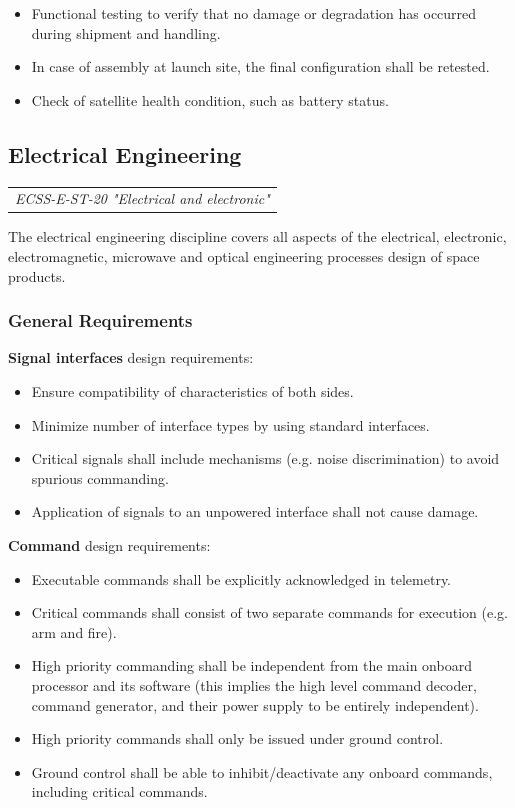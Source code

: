\begin{itemize}
\item Functional testing to verify that no damage or degradation has occurred during shipment and handling.
\item In case of assembly at launch site, the final configuration shall be retested.
\item Check of satellite health condition, such as battery status.
\end{itemize}

\subsection{Electrical Engineering}

\begin{tabular}{l}
\textit{ECSS-E-ST-20 "Electrical and electronic" \cite{ECSS-E-ST-20}}
\end{tabular}

The electrical engineering discipline covers all aspects of the electrical, electronic, electromagnetic, microwave and optical engineering processes design of space products. 

\subsubsection{General Requirements}

\textbf{Signal interfaces} design requirements:

\begin{itemize}
\item Ensure compatibility of characteristics of both sides.
\item Minimize number of interface types by using standard interfaces.
\item Critical signals shall include mechanisms (e.g. noise discrimination) to avoid spurious commanding.
\item Application of signals to an unpowered interface shall not cause damage.
\end{itemize}

\textbf{Command} design requirements:

\begin{itemize}
\item Executable commands shall be explicitly acknowledged in telemetry.
\item Critical commands shall consist of two separate commands for execution (e.g. arm and fire).
\item High priority commanding shall be independent from the main onboard processor and its software (this implies the high level command decoder, command generator, and their power supply to be entirely independent).
\item High priority commands shall only be issued under ground control.
\item Ground control shall be able to inhibit/deactivate any onboard commands, including critical commands.
\end{itemize}

